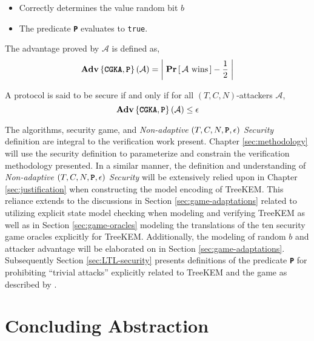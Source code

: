 \begin{itemize}
\item
  Correctly determines the value random bit \(b\)
\item
  The predicate \textbf{\texttt{P}} evaluates to \texttt{true}.
\end{itemize}

\begin{definition}
The advantage proved by $\mathcal{A}$ is defined as,
$$ \normalfont{\textbf{Adv}}\left\{\textbf{\texttt{CGKA}},\textbf{\texttt{P}}\right\}(\mathcal{A})  = \left|\; \textbf{Pr}\left[ \,\mathcal{A}\text{ wins}\, \right] - \frac{1}{2} \;\right| $$
\end{definition}

\begin{definition}  
\label{def:CGKA-Security}
A  protocol is said to be secure if and only if for all $(T, C, N)$-attackers $\mathcal{A}$,
$$ \normalfont\textbf{Adv}\left\{\textbf{\texttt{CGKA}},\textbf{\texttt{P}}\right\}(\mathcal{A}) \leq \epsilon $$
\end{definition}

The  algorithms, security game, and \emph{Non-adaptive} \((T, C, N, \textbf{\texttt{P}}, \epsilon)\) \emph{ Security} definition are integral to the verification work present.
Chapter \ref{sec:methodology} will use the security definition to parameterize and constrain the verification methodology presented.
In a similar manner, the definition and understanding of \emph{Non-adaptive} \((T, C, N, \textbf{\texttt{P}}, \epsilon)\) \emph{ Security} will be extensively relied upon in Chapter \ref{sec:justification} when constructing the model encoding of TreeKEM.
This reliance extends to the discussions in Section \ref{sec:game-adaptations} related to utilizing explicit state model checking when modeling and verifying TreeKEM
as well as in Section \ref{sec:game-oracles} modeling the translations of the ten  security game oracles explicitly for TreeKEM.
Additionally, the modeling of random \(b\) and attacker advantage will be elaborated on in Section \ref{sec:game-adaptations}.
Subsequently Section \ref{sec:LTL-security} presents definitions of the predicate \textbf{\texttt{P}} for prohibiting ``trivial attacks'' explicitly related to TreeKEM and the  game as described by \autocite{alwen2020security}.


\hypertarget{concluding-abstraction}{%
\section{Concluding Abstraction}\label{concluding-abstraction}}

